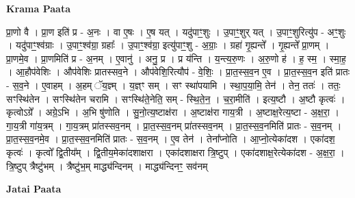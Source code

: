 \documentclass[17pt]{extarticle}
\begin{document}
\textbf{Krama Paata} \newline

प्रा॒णो वै । प्रा॒ण इति॑ प्र - अ॒नः । वा ए॒षः । ए॒ष यत् । यदु॑पाꣳ॒॒शुः । उ॒पाꣳ॒॒शुर् यत् । उ॒पाꣳ॒॒शुरित्यु॑प - अꣳ॒॒शुः । यदु॑पाꣳ॒॒श्व॑ग्राः । उ॒पाꣳ॒॒श्व॑ग्रा॒ ग्रहाः᳚ । उ॒पाꣳ॒॒श्व॑ग्रा॒ इत्यु॑पाꣳ॒॒शु - अ॒ग्राः॒ । ग्रहा॑ गृ॒ह्यन्ते᳚ । गृ॒ह्यन्ते᳚ प्रा॒णम् । प्रा॒णमे॒व । प्रा॒णमिति॑ प्र - अ॒नम् । ए॒वानु॑ । अनु॒ प्र । प्र य॑न्ति । य॒न्त्य॒रु॒णः । अ॒रु॒णो ह॑ । ह॒ स्म॒ । स्मा॒ह॒ । आ॒हौप॑वेशिः । औप॑वेशिः प्रातस्सव॒ने । औप॑वेशि॒रित्यौप॑ - वे॒शिः॒ । प्रा॒त॒स्स॒व॒न ए॒व । प्रा॒त॒स्स॒व॒न इति॑ प्रातः - स॒व॒ने । ए॒वाहम् । अ॒हम् ॅय॒ज्ञ्म् । य॒ज्ञ्ꣳ सम् । सꣳ स्था॑पयामि । स्था॒प॒या॒मि॒ तेन॑ । तेन॒ ततः॑ । ततः॒ सꣳस्थि॑तेन । सꣳस्थि॑तेन चरामि । सꣳस्थि॑ते॒नेति॒ सम् - स्थि॒ते॒न॒ । च॒रा॒मीति॑ । इत्य॒ष्टौ । अ॒ष्टौ कृत्वः॑ । कृत्वोऽग्रे᳚ । अग्रे॒ऽभि । अ॒भि षु॑णोति । सु॒नो॒त्य॒ष्टाक्ष॑रा । अ॒ष्टाक्ष॑रा गाय॒त्री । अ॒ष्टाक्ष॒रेत्य॒ष्टा - अ॒क्ष॒रा॒ । गा॒य॒त्री गा॑य॒त्रम् । गा॒य॒त्रम् प्रा॑तस्सव॒नम् । प्रा॒त॒स्स॒व॒नम् प्रा॑तस्सव॒नम् । प्रा॒त॒स्स॒व॒नमिति॑ प्रातः - स॒व॒नम् । प्रा॒त॒स्स॒व॒नमे॒व । प्रा॒त॒स्स॒व॒नमिति॑ प्रातः - स॒व॒नम् । ए॒व तेन॑ । तेना᳚प्नोति । आ॒प्नो॒त्येका॑दश । एका॑दश॒ कृत्वः॑ । कृत्वो᳚ द्वि॒तीय᳚म् । द्वि॒तीय॒मेका॑दशाक्षरा । एका॑दशाक्षरा त्रि॒ष्टुप् । एका॑दशाक्ष॒रेत्येका॑दश - अ॒क्ष॒रा॒ । त्रि॒ष्टुप् त्रैष्टु॑भम् । त्रैष्टु॑भ॒म् माद्ध्य॑न्दिनम् । माद्ध्य॑न्दिनꣳ॒॒ सव॑नम् \newline

\textbf{Jatai Paata} \newline
\end{document}
